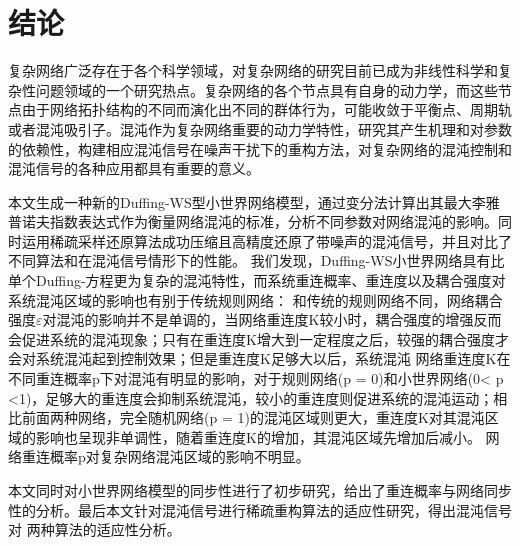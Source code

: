 \chapter{结论}
复杂网络广泛存在于各个科学领域，对复杂网络的研究目前已成为非线性科学和复杂性问题领域的一个研究热点。复杂网络的各个节点具有自身的动力学，而这些节点由于网络拓扑结构的不同而演化出不同的群体行为，可能收敛于平衡点、周期轨或者混沌吸引子。混沌作为复杂网络重要的动力学特性，研究其产生机理和对参数的依赖性，构建相应混沌信号在噪声干扰下的重构方法，对复杂网络的混沌控制和混沌信号的各种应用都具有重要的意义。
\par 本文生成一种新的Duffing-WS型小世界网络模型，通过变分法计算出其最大李雅普诺夫指数表达式作为衡量网络混沌的标准，分析不同参数对网络混沌的影响。同时运用稀疏采样还原算法成功压缩且高精度还原了带噪声的混沌信号，并且对比了不同算法和在混沌信号情形下的性能。
我们发现，Duffing-WS小世界网络具有比单个Duffing-方程更为复杂的混沌特性，而系统重连概率、重连度以及耦合强度对系统混沌区域的影响也有别于传统规则网络：
和传统的规则网络不同，网络耦合强度$\varepsilon$对混沌的影响并不是单调的，当网络重连度K较小时，耦合强度的增强反而会促进系统的混沌现象；只有在重连度K增大到一定程度之后，较强的耦合强度才会对系统混沌起到控制效果；但是重连度K足够大以后，系统混沌
网络重连度K在不同重连概率p下对混沌有明显的影响，对于规则网络(p = 0)和小世界网络(0< p <1)，足够大的重连度会抑制系统混沌，较小的重连度则促进系统的混沌运动；相比前面两种网络，完全随机网络(p = 1)的混沌区域则更大，重连度K对其混沌区域的影响也呈现非单调性，随着重连度K的增加，其混沌区域先增加后减小。
网络重连概率p对复杂网络混沌区域的影响不明显。\par
本文同时对小世界网络模型的同步性进行了初步研究，给出了重连概率与网络同步性的分析。最后本文针对混沌信号进行稀疏重构算法的适应性研究，得出混沌信号对
两种算法的适应性分析。